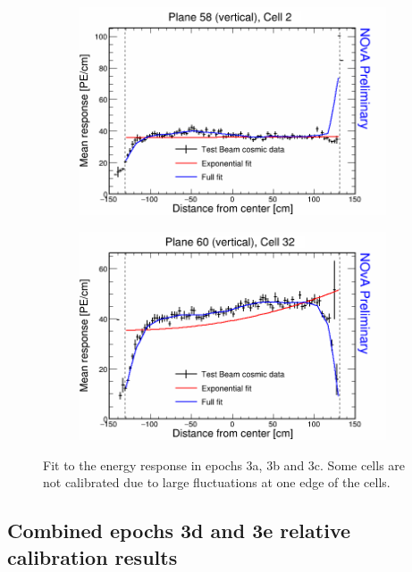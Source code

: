 \begin{figure}[h]
  \begin{subfigure}{0.495\textwidth}
    \includegraphics[width=\linewidth]{Plots/RelativeCalibrationResults/ep3abc_058_002.png}
  \end{subfigure}
  \begin{subfigure}{0.495\textwidth}
    \includegraphics[width=\linewidth]{Plots/RelativeCalibrationResults/ep3abc_060_032.png}
  \end{subfigure}
  \caption[Attenuation fits for cells with large fluctuations in period 3 data]{Fit to the energy response in epochs 3a, 3b and 3c. Some cells are not calibrated due to large fluctuations at one edge of the cells.}
  \label{fig:AttenfitResultsEpoch3abc_CellEdges}
\end{figure}

\subsection*{Combined epochs 3d and 3e relative calibration results}

